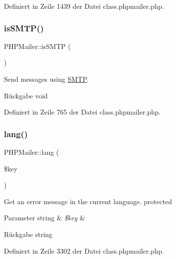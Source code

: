 Definiert in Zeile 1439 der Datei class.\+phpmailer.\+php.

\mbox{\label{class_p_h_p_mailer_aa94bd392205c9a523671d39fb1f6e079}} 
\subsubsection{\texorpdfstring{is\+S\+M\+T\+P()}{isSMTP()}}
{\footnotesize\ttfamily P\+H\+P\+Mailer\+::is\+S\+M\+TP (\begin{DoxyParamCaption}{ }\end{DoxyParamCaption})}

Send messages using \mbox{\hyperlink{class_s_m_t_p}{S\+M\+TP}}. \begin{DoxyReturn}{Rückgabe}
void 
\end{DoxyReturn}


Definiert in Zeile 765 der Datei class.\+phpmailer.\+php.

\mbox{\label{class_p_h_p_mailer_a60edd0800fd302bac9c30dbde7d705c5}} 
\subsubsection{\texorpdfstring{lang()}{lang()}}
{\footnotesize\ttfamily P\+H\+P\+Mailer\+::lang (\begin{DoxyParamCaption}\item[{}]{\$key }\end{DoxyParamCaption})\hspace{0.3cm}{\ttfamily [protected]}}

Get an error message in the current language.  protected 
\begin{DoxyParams}[1]{Parameter}
string & {\em \$key} & \\
\hline
\end{DoxyParams}
\begin{DoxyReturn}{Rückgabe}
string 
\end{DoxyReturn}


Definiert in Zeile 3302 der Datei class.\+phpmailer.\+php.

\mbox{\label{class_p_h_p_mailer_a1709b010e29511267411c882516ac87f}} 
